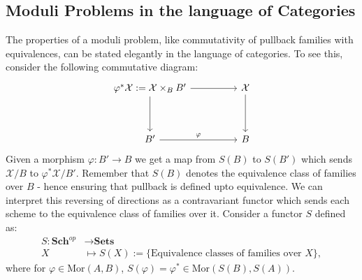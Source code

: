 \subsection{Moduli Problems in the language of Categories}
The properties of a moduli problem, like commutativity of pullback families with equivalences, can be stated elegantly in the language of categories.
To see this, consider the following commutative diagram:
\[
    \begin{tikzcd}
        {\varphi^{*}\mathcal{X} := \mathcal{X} \times_{B} B'} & & \mathcal{X}\\
        \\
        B' && B
        \arrow[ from = 1-3, to = 3-3]
        \arrow[from = 1-1, to = 1-3]
        \arrow["\varphi", from = 3-1, to = 3-3]
        \arrow[from = 1-1, to = 3-1]
    \end{tikzcd}
\]
Given a morphism $\varphi: B' \to B$ we get a map from $S(B)$ to $S(B')$ which sends $\mathcal{X}/B$ to $\varphi^{*}\mathcal{X}/B'$. 
Remember that $S(B)$ denotes the equivalence class of families over $B$ - hence ensuring that pullback is defined upto equivalence.
We can interpret this reversing of directions as a contravariant functor which sends each scheme to the equivalence class of families over it. 
Consider a functor $S$ defined as:
\begin{align*}
    S:\textbf{Sch}^{op} & \to \textbf{Sets}\\
    X &\mapsto S(X):=\{\text{Equivalence classes of families over }X\},
\end{align*}
where for $\varphi \in \text{Mor}(A,B)$, $S(\varphi) = \varphi^{*} \in \text{Mor}(S(B),S(A))$. 
